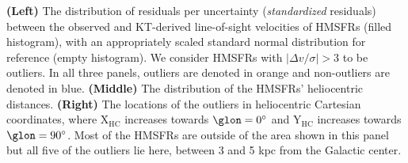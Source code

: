 \label{fig:outliers}
\textbf{(Left)} The distribution of residuals per uncertainty (\textit{standardized} residuals) between the observed and KT-derived line-of-sight velocities of HMSFRs (filled histogram), with an appropriately scaled standard normal distribution for reference (empty histogram). We consider HMSFRs with $\vert \Delta v / \sigma \vert > 3$ to be outliers. In all three panels, outliers are denoted in orange and non-outliers are denoted in blue. \textbf{(Middle)} The distribution of the HMSFRs' heliocentric distances. \textbf{(Right)} The locations of the outliers in heliocentric Cartesian coordinates, where $\mathrm{X_{HC}}$ increases towards $\glon=0^\circ$ and $\mathrm{Y_{HC}}$ increases towards $\glon=90^\circ$. Most of the HMSFRs are outside of the area shown in this panel but all five of the outliers lie here, between 3 and 5 kpc from the Galactic center.